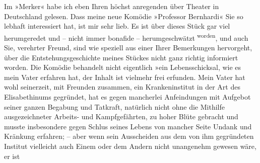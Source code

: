 \pstart
           Im »Merker« habe ich eben Ihren höchst anregenden
                  \label{K_L02114-2v}\label{K_L02114-2} über Theater in
                  Deutschland gelesen. Dass meine neue Komödie
                  »Professor Bernhardi« Sie so lebhaft
               interessiert hat, ist mir sehr lieb. Es ist über dieses Stück gar viel herumgeredet
               und – nicht immer bonafide – herumgeschwätzt\substVorne{}\textsuperscript{{ }worden}\substDazwischen{},\substHinten{} und auch Sie, verehrter Freund, sind wie speziell aus einer Ihrer
               Bemerkungen hervorgeht, über die Entstehungsgeschichte meines Stückes nicht ganz
               richtig informiert worden. Die Komödie behandelt nicht eigentlich »ein Lebensschicksal, wie es mein Vater
               erfahren hat, der Inhalt ist vielmehr frei erfunden. Mein {\pb}Vater hat wohl seinerzeit,
               mit Freunden zusammen, ein Krankeninstitut in der Art des Elisabethinums gegründet, hat es gegen
               mancherlei Anfeindungen mit Aufgebot seiner ganzen Begabung und Tatkraft, natürlich
               nicht ohne die Mithilfe ausgezeichneter Arbeits- und Kampfgefährten, zu hoher Blüte
               gebracht und musste insbesondere gegen Schlus seines Lebens von mancher Seite Undank
               und Kränkung erfahren; – aber wenn sein Ausscheiden aus dem von ihm gegründeten
               Institut vielleicht auch Einem oder dem Andern nicht unangenehm gewesen wäre, er ist
